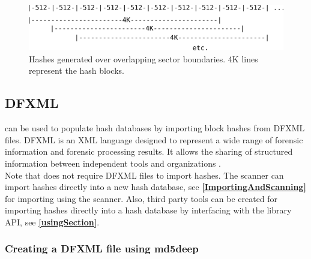 \documentclass[11pt,fleqn]{article} %
\begin{document}
\begin{figure}
	\center
	\includegraphics[scale=1.1]{drawings/sector_boundaries}
	\caption{Hashes generated over overlapping sector boundaries. 4K lines represent the hash blocks.}
	\label{fig:sectorboundaries}
\end{figure}



\subsection{DFXML}
\label{createDFXML}
\hash can be used to populate hash databases by importing block hashes from DFXML files.
DFXML is an XML language designed to represent a wide range of forensic information and forensic processing results. It allows the sharing of structured information between independent tools and organizations \cite{dfxmlpaper}.\\

Note that \hash does not require DFXML files to import hashes.
The \bulk \hash scanner can import hashes directly into a new hash database,
see \textbf{\autoref{ImportingAndScanning}} for importing using the \bulk \hash scanner.
Also, third party tools can be created for importing hashes
directly into a hash database by interfacing with the \hash library API,
see \textbf{\autoref{usingSection}}.

\subsubsection{Creating a DFXML file using \textbf{md5deep}}
\end{document}
